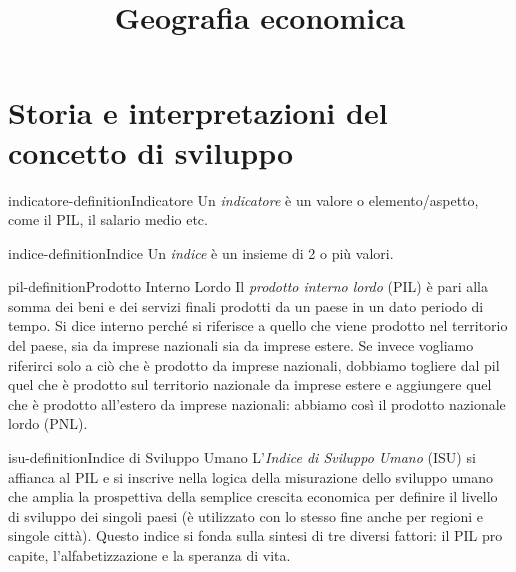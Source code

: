 \documentclass[preview]{standalone}
\begin{document}
\title{Geografia economica}
\genpage

\section{Storia e interpretazioni del concetto di sviluppo}

\begin{snippetdefinition}{indicatore-definition}{Indicatore}
    Un \textit{indicatore} è un valore o elemento/aspetto, come il PIL, il salario medio etc.
\end{snippetdefinition}

\begin{snippetdefinition}{indice-definition}{Indice}
    Un \textit{indice} è un insieme di 2 o più valori.
\end{snippetdefinition}


\begin{snippetdefinition}{pil-definition}{Prodotto Interno Lordo}
    Il \textit{prodotto interno lordo} (PIL) è pari alla somma dei beni e dei servizi finali
    prodotti da un paese in un dato periodo di tempo. Si dice interno perché si riferisce
    a quello che viene prodotto nel territorio del paese, sia da imprese nazionali sia
    da imprese estere. Se invece vogliamo riferirci solo a ciò che è prodotto da
    imprese nazionali, dobbiamo togliere dal pil quel che è prodotto sul territorio
    nazionale da imprese estere e aggiungere quel che è prodotto all'estero da
    imprese nazionali: abbiamo così il prodotto nazionale lordo (PNL).
\end{snippetdefinition}


\begin{snippetdefinition}{isu-definition}{Indice di Sviluppo Umano}
    L'\textit{Indice di Sviluppo Umano} (ISU) si affianca al PIL e si inscrive
    nella logica della misurazione dello sviluppo umano che amplia la prospettiva
    della semplice crescita economica per definire il livello di sviluppo dei singoli
    paesi (è utilizzato con lo stesso fine anche per regioni e singole città).
    Questo indice si fonda sulla sintesi di tre diversi fattori: il PIL pro capite,
    l'alfabetizzazione e la speranza di vita.
\end{snippetdefinition}
\end{document}
